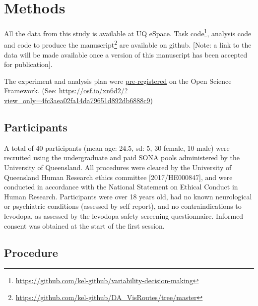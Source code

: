 \documentclass[
  man]{apa6}
\begin{document}
\hypertarget{methods}{%
\section{Methods}\label{methods}}

\label{sec:Methods}

All the data from this study is available at UQ eSpace. Task code\footnote{\url{https://github.com/kel-github/variability-decision-making}}, analysis code and code to produce the manuscript\footnote{\url{https://github.com/kel-github/DA_VisRoutes/tree/master}} are available on github. {[}Note: a link to the data will be made available once a version of this manuscript has been accepted for publication{]}.

The experiment and analysis plan were \href{https://osf.io/xn6d2/?view_only=4fc3aea02fa14da79651d892db6888c9}{pre-registered} on the Open Science Framework. (See: \url{https://osf.io/xn6d2/?view_only=4fc3aea02fa14da79651d892db6888c9})

\hypertarget{participants}{%
\subsection{Participants}\label{participants}}

\label{sec:Participants}

A total of 40 participants (mean age: 24.5, sd: 5, 30 female, 10 male) were recruited using the undergraduate and paid SONA pools administered by the University of Queensland. All procedures were cleared by the University of Queensland Human Research ethics committee {[}2017/HE000847{]}, and were conducted in accordance with the National Statement on Ethical Conduct in Human Research. Participants were over 18 years old, had no known neurological or psychiatric conditions (assessed by self report), and no contraindications to levodopa, as assessed by the levodopa safety screening questionnaire. Informed consent was obtained at the start of the first session.

\hypertarget{procedure}{%
\subsection{Procedure}\label{procedure}}

\label{sec:Procedure}
\end{document}
